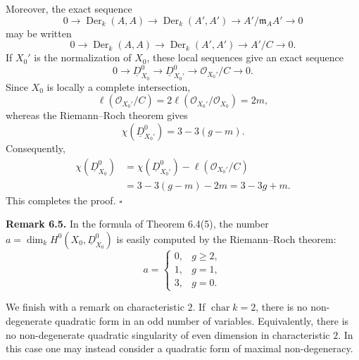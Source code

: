Moreover, the exact sequence
\[
0\longrightarrow\operatorname{Der}_k(A,A)
 \longrightarrow\operatorname{Der}_k(A',A')
 \longrightarrow A'/\mathfrak m_AA'\longrightarrow0
\]
may be written
\[
0\longrightarrow\operatorname{Der}_k(A,A)
 \longrightarrow\operatorname{Der}_k(A',A')
 \longrightarrow A'/C\longrightarrow0.
\]
If $X_0'$ is the normalization of $X_0$, these local sequences give
an exact sequence
\[
0\longrightarrow\underline D^0_{X_0}
 \longrightarrow\underline D^0_{X_0'}
 \longrightarrow\mathcal O_{X_0'}/C\longrightarrow0.
\]
Since $X_0$ is locally a complete intersection,
\[
\ell(\mathcal O_{X_0'}/C)
=2\ell(\mathcal O_{X_0'}/\mathcal O_{X_0})=2m,
\]
whereas the Riemann--Roch theorem gives
\[
\chi(\underline D^0_{X_0'})=3-3(g-m).
\]
Consequently,
\[
\begin{aligned}
\chi(\underline D^0_{X_0})
&=\chi(\underline D^0_{X_0'})
 -\ell(\mathcal O_{X_0'}/C)\\
&=3-3(g-m)-2m=3-3g+m.
\end{aligned}
\]
This completes the proof.
\hfill$\square$

\par\medskip
\noindent\textbf{Remark 6.5.}
In the formula of Theorem 6.4(5), the number
$a=\dim_kH^0(X_0,\underline D^0_{X_0})$ is easily computed by the
Riemann--Roch theorem:
\[
a=
\begin{cases}
0,&g\geq2,\\
1,&g=1,\\
3,&g=0.
\end{cases}
\]

We finish with a remark on characteristic $2$. If
$\operatorname{char}k=2$, there is no non-degenerate quadratic form
in an odd number of variables. Equivalently, there is no
non-degenerate quadratic singularity of even dimension in
characteristic $2$. In this case one may instead consider a quadratic
form of maximal non-degeneracy.
